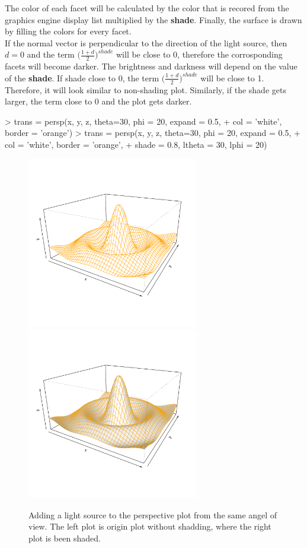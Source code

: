\documentclass[paper=a4, fontsize=11pt]{report}
\begin{document}
The color of each facet will be calculated by the color that is recored from the graphics engine display list multiplied by the \textbf{shade}. Finally, the surface is drawn by filling the colors for every facet.\\

If the normal vector is perpendicular to the direction of the light source, then $d = 0$ and the term $\big(\frac{1 + d}{2}\big)^{shade}$ will be close to 0, therefore the corrosponding facets will become darker. The brightness and darkness will depend on the value of the \textbf{shade}. If shade close to 0, the term $\big(\frac{1 + d}{2}\big)^{shade}$ will be close to 1. Therefore, it will look similar to non-shading plot. Similarly, if the shade gets larger, the term close to 0 and the plot gets darker.

\begin{Schunk}
\begin{Sinput}
> trans = persp(x, y, z, theta=30, phi = 20, expand = 0.5,
+  col = 'white', border = 'orange')
> trans = persp(x, y, z, theta=30, phi = 20, expand = 0.5,
+  col = 'white', border = 'orange', 
+  shade = 0.8, ltheta = 30, lphi = 20)
\end{Sinput}
\end{Schunk}


\begin{figure}[h]
\begin{center}
  \includegraphics[height = 7.5cm, width = 7.5cm]{figure/Lighting_1.pdf}
  \includegraphics[height = 7.5cm, width = 7.5cm]{figure/Lighting_2.pdf}
  \caption{Adding a light source to the perspective plot from the same angel of view. The left plot is origin plot without shadding, where the right plot is been shaded.}
  	\label{figure7}
\end{center}
\end{figure}
\end{document}
